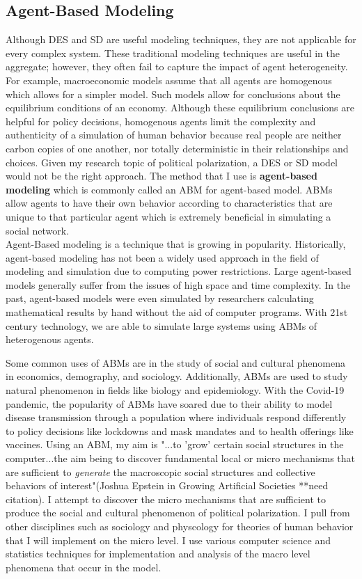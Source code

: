 \subsection{Agent-Based Modeling}
Although DES and SD are useful modeling techniques, they are not applicable for every complex system. These traditional modeling techniques are useful in the aggregate; however, they often fail to capture the impact of agent heterogeneity. For example, macroeconomic models assume that all agents are homogenous which allows for a simpler model. Such models allow for conclusions about the equilibrium conditions of an economy. Although these equilibrium conclusions are helpful for policy decisions, homogenous agents limit the complexity and authenticity of a simulation of human behavior because real people are neither carbon copies of one another, nor totally deterministic in their relationships and choices. Given my research topic of political polarization, a DES or SD model would not be the right approach. The method that I use is \textbf{agent-based modeling} which is commonly called an ABM for agent-based model. ABMs allow agents to have their own behavior according to characteristics that are unique to that particular agent which is extremely beneficial in simulating a social network. \\

Agent-Based modeling is a technique that is growing in popularity. Historically, agent-based modeling has not been a widely used approach in the field of modeling and simulation due to computing power restrictions. Large agent-based models generally suffer from the issues of high space and time complexity. In the past, agent-based models were even simulated by researchers calculating mathematical results by hand without the aid of computer programs. With 21st century technology, we are able to simulate large systems using ABMs of heterogenous agents. 

Some common uses of ABMs are in the study of social and cultural phenomena in economics, demography, and sociology. Additionally, ABMs are used to study natural phenomenon in fields like biology and epidemiology. With the Covid-19 pandemic, the popularity of ABMs have soared due to their ability to model disease transmission through a population where individuals respond differently to policy decisions like lockdowns and mask mandates and to health offerings like vaccines. Using an ABM, my aim is "...to 'grow' certain social structures in the computer...the aim being to discover fundamental local or micro mechanisms that are sufficient to \textit{generate} the macroscopic social structures and collective behaviors of interest"(Joshua Epstein in Growing Artificial Societies **need citation). I attempt to discover the micro mechanisms that are sufficient to produce the social and cultural phenomenon of political polarization. I pull from other disciplines such as sociology and physcology for theories of human behavior that I will implement on the micro level. I use various computer science and statistics techniques for implementation and analysis of the macro level phenomena that occur in the model.    


